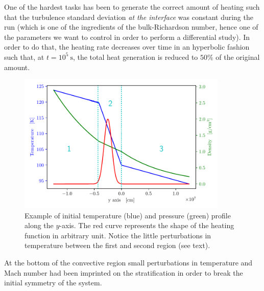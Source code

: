 One of the hardest tasks has been to generate the correct amount of heating such that the turbulence standard deviation \textit{at the interface} was constant during the run (which is one of the ingredients of the bulk-Richardson number, hence one of the parameters we want to control in order to perform a differential study). In order to do that, the heating rate decreases over time in an hyperbolic fashion such that, at $t=10^5 \ \mathrm{s}$, the total heat generation is reduced to $50 \%$ of the original amount.

\begin{figure}[t]
\centering
\includegraphics[width=10cm]{./img/twin.pdf}
\caption{Example of initial temperature (blue) and pressure (green) profile along the $y$-axis. The red curve represents the shape of the heating function in arbitrary unit. Notice the little perturbations in temperature between the first and second region (see text).}
\label{fig:twin}
\centering
\end{figure}
At the bottom of the convective region small perturbations in temperature and Mach number had been imprinted on the stratification in order to break the initial symmetry of the system.

